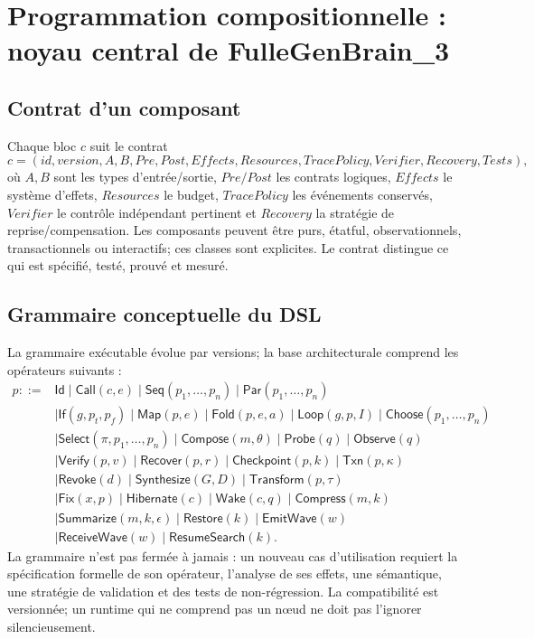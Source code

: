 \documentclass[11pt,a4paper]{article}
\begin{document}
\section{Programmation compositionnelle : noyau central de FulleGenBrain\_3}
\subsection{Contrat d'un composant}
Chaque bloc $c$ suit le contrat
\[
c=(id,version,A,B,Pre,Post,Effects,Resources,TracePolicy,Verifier,Recovery,Tests),
\]
où $A,B$ sont les types d'entrée/sortie, $Pre/Post$ les contrats logiques, $Effects$ le système d'effets, $Resources$ le budget, $TracePolicy$ les événements conservés, $Verifier$ le contrôle indépendant pertinent et $Recovery$ la stratégie de reprise/compensation. Les composants peuvent être purs, étatful, observationnels, transactionnels ou interactifs; ces classes sont explicites. Le contrat distingue ce qui est spécifié, testé, prouvé et mesuré.

\subsection{Grammaire conceptuelle du DSL}
La grammaire exécutable évolue par versions; la base architecturale comprend les opérateurs suivants :
\begin{align*}
p ::= {}& \mathsf{Id}\mid\mathsf{Call}(c,e)\mid\mathsf{Seq}(p_1,\dots,p_n)\mid\mathsf{Par}(p_1,\dots,p_n)\\
&\mid\mathsf{If}(g,p_t,p_f)\mid\mathsf{Map}(p,e)\mid\mathsf{Fold}(p,e,a)\mid\mathsf{Loop}(g,p,I)\mid\mathsf{Choose}(p_1,\ldots,p_n)\\
&\mid\mathsf{Select}(\pi,p_1,\ldots,p_n)\mid\mathsf{Compose}(m,\theta)\mid\mathsf{Probe}(q)\mid\mathsf{Observe}(q)\\
&\mid\mathsf{Verify}(p,v)\mid\mathsf{Recover}(p,r)\mid\mathsf{Checkpoint}(p,k)\mid\mathsf{Txn}(p,\kappa)\\
&\mid\mathsf{Revoke}(d)\mid\mathsf{Synthesize}(G,D)\mid\mathsf{Transform}(p,\tau)\\
&\mid\mathsf{Fix}(x,p)\mid\mathsf{Hibernate}(c)\mid\mathsf{Wake}(c,q)\mid\mathsf{Compress}(m,k)\\
&\mid\mathsf{Summarize}(m,k,\epsilon)\mid\mathsf{Restore}(k)\mid\mathsf{EmitWave}(w)\\
&\mid\mathsf{ReceiveWave}(w)\mid\mathsf{ResumeSearch}(k).
\end{align*}
La grammaire n'est pas fermée à jamais : un nouveau cas d'utilisation requiert la spécification formelle de son opérateur, l'analyse de ses effets, une sémantique, une stratégie de validation et des tests de non-régression. La compatibilité est versionnée; un runtime qui ne comprend pas un nœud ne doit pas l'ignorer silencieusement.
\end{document}
